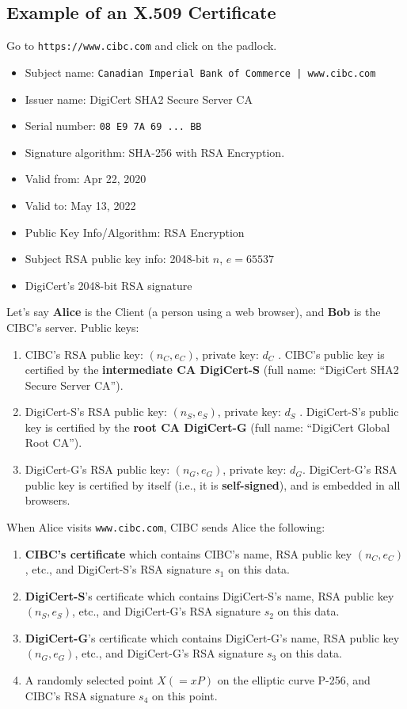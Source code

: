 \documentclass[12pt,titlepage]{article}
\begin{document}
\subsection{Example of an X.509 Certificate}
Go to \texttt{https://www.cibc.com} and click on the padlock.\begin{itemize}
	\item Subject name: \texttt{Canadian Imperial Bank of Commerce | www.cibc.com}
	\item Issuer name: DigiCert SHA2 Secure Server CA
	\item Serial number: \texttt{08 E9 7A 69 ... BB}
	\item Signature algorithm: SHA-256 with RSA Encryption.
	\item Valid from: Apr 22, 2020
	\item Valid to: May 13, 2022
	\item Public Key Info/Algorithm: RSA Encryption
	\item Subject RSA public key info: 2048-bit $n$, $e = 65537$
	\item DigiCert’s 2048-bit RSA signature
\end{itemize}
Let's say \textbf{Alice} is the Client (a person using a web browser), and \textbf{Bob} is the CIBC’s server.
Public keys:\begin{enumerate}
	\item CIBC’s RSA public key: $(n_C , e_C)$, private key: $d_C$ . CIBC’s public key is certified by the \textbf{intermediate CA DigiCert-S} (full name: ``DigiCert SHA2 Secure Server CA'').
	\item DigiCert-S’s RSA public key: $(n_S, e_S)$, private key: $d_S$ . DigiCert-S’s public key is certified by the \textbf{root CA DigiCert-G} (full name: ``DigiCert Global Root CA'').
	\item DigiCert-G’s RSA public key: $(n_G , e_G)$, private key: $d_G$. DigiCert-G’s RSA public key is certified by itself (i.e., it is \textbf{self-signed}), and is embedded in all browsers.
\end{enumerate}
When Alice visits \texttt{www.cibc.com}, CIBC sends Alice the following:\begin{enumerate}
	\item \textbf{CIBC’s certificate} which contains CIBC’s name, RSA public key $(n_C , e_C )$, etc., and DigiCert-S’s RSA signature $s_1$ on this data.
	\item \textbf{DigiCert-S}’s certificate which contains DigiCert-S’s name, RSA public key $(n_S , e_S )$, etc., and DigiCert-G’s RSA signature $s_2$ on this data.
	\item \textbf{DigiCert-G}’s certificate which contains DigiCert-G’s name, RSA public key $(n_G , e_G )$, etc., and DigiCert-G’s RSA signature $s_3$ on this data.
	\item A randomly selected point $X (= xP)$ on the elliptic curve P-256, and CIBC’s RSA signature $s_4$ on this point.
\end{enumerate}
\end{document}
